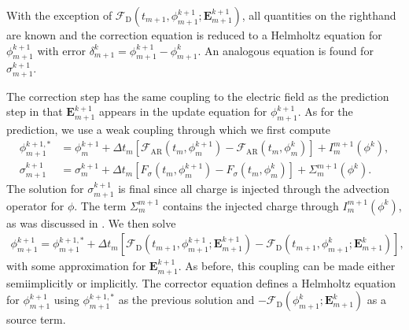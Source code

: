 \documentclass[letterpaper,10pt,english]{sphinxmanual}
\begin{document}
With the exception of \(\mathcal{F}_{\textrm{D}}\left(t_{m+1}, \phi_{m+1}^{k+1}; \mathbf{E}_{m+1}^{k+1}\right)\), all quantities on the right\sphinxhyphen{}hand are known and the correction equation is reduced to a Helmholtz equation for \(\phi_{m+1}^{k+1}\) with error \(\delta_{m+1}^k = \phi_{m+1}^{k+1} - \phi_{m+1}^k\). An analogous equation is found for \(\sigma_{m+1}^{k+1}\).

The correction step has the same coupling to the electric field as the prediction step in that \(\mathbf{E}_{m+1}^{k+1}\) appears in the update equation for \(\phi_{m+1}^{k+1}\). As for the prediction, we use a weak coupling through which we first compute
\begin{align}
\phi_{m+1}^{k+1,\ast} &= \phi_m^{k+1} + \Delta t_m\left[\mathcal{F}_{\textrm{AR}}\left(t_m, \phi_m^{k+1}\right) - \mathcal{F}_{\textrm{AR}}\left(t_m, \phi_m^{k}\right)\right] + I_m^{m+1}\left(\phi^k\right),\\
\sigma_{m+1}^{k+1} &= \sigma_m^{k+1} + \Delta t_m\left[F_\sigma\left(t_m, \phi_m^{k+1}\right) - F_\sigma\left(t_m, \phi_m^{k}\right)\right] + \Sigma_m^{m+1}\left(\phi^k\right).
\end{align}
The solution for \(\sigma_{m+1}^{k+1}\) is final since all charge is injected through the advection operator for \(\phi\). The term \(\Sigma_m^{m+1}\) contains the injected charge through \(I_m^{m+1}\left(\phi^k\right)\), as was discussed in {\hyperref[\detokenize{Model:chap-spatialdiscretization}]{}}. We then solve
\begin{equation*}
\begin{split}\phi_{m+1}^{k+1} = \phi_{m+1}^{k+1, \ast} + \Delta t_m\left[\mathcal{F}_{\textrm{D}}\left(t_{m+1}, \phi_{m+1}^{k+1}; \mathbf{E}_{m+1}^{k+1}\right) - \mathcal{F}_{\textrm{D}}\left(t_{m+1}, \phi_{m+1}^{k}; \mathbf{E}_{m+1}^k\right)\right],\end{split}
\end{equation*}
with some approximation for \(\mathbf{E}_{m+1}^{k+1}\). As before, this coupling can be made either semi\sphinxhyphen{}implicitly or implicitly. The corrector equation defines a Helmholtz equation for \(\phi_{m+1}^{k+1}\) using \(\phi_{m+1}^{k+1,\ast}\) as the previous solution and \(-\mathcal{F}_{\textrm{D}}\left(\phi_{m+1}^{k}; \mathbf{E}_{m+1}^k\right)\) as a source term.
\end{document}
